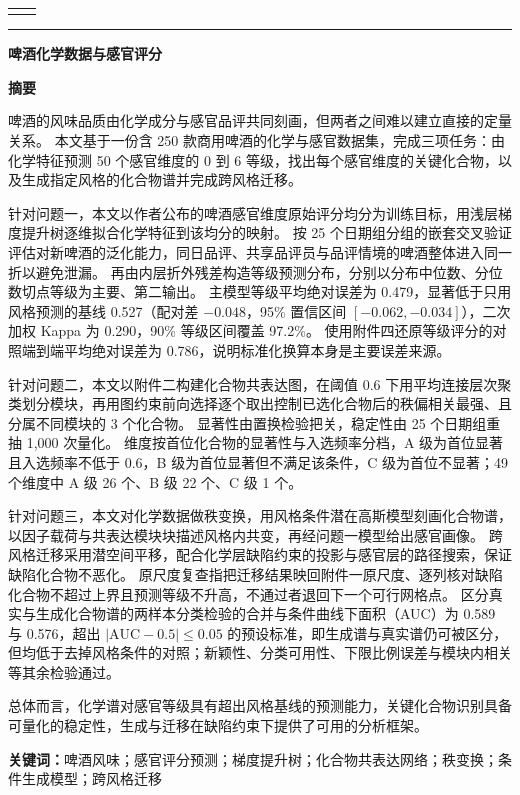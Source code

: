 \documentclass[12pt,a4paper]{article}
\renewcommand{\arraystretch}{1.25}
\newcommand{\teaminfo}[2]{%
  \par\begingroup\centering
  \renewcommand{\arraystretch}{1.15}
  \begin{tabular}{|c|c|}
    \hline
    \makebox[3.9cm][c]{队伍编号} & \makebox[3.9cm][c]{#1} \\
    \hline
    \makebox[3.9cm][c]{赛道} & \makebox[3.9cm][c]{#2} \\
    \hline
  \end{tabular}
  \par\endgroup
}
\renewenvironment{abstract}{%
  \small
  \begin{center}{\bfseries 摘\quad 要}\end{center}%
  \par\vspace{0.5em}%
  \noindent\ignorespaces
}{\par}
\newcommand{\papertitle}{啤酒化学数据与感官评分}
\begin{document}
\vspace*{-0.5cm}
\teaminfo{MCB2607307}{（A）}

\vspace{0.15cm}
\noindent\textcolor{gray}{\rule{14.5cm}{1pt}}
\vspace{0.15cm}

{\centering\bfseries\large\papertitle\par}

\begin{abstract}
啤酒的风味品质由化学成分与感官品评共同刻画，但两者之间难以建立直接的定量关系。
本文基于一份含 250 款商用啤酒的化学与感官数据集，完成三项任务：由化学特征预测 50 个感官维度的 0 到 6 等级，找出每个感官维度的关键化合物，以及生成指定风格的化合物谱并完成跨风格迁移。

针对问题一，本文以作者公布的啤酒感官维度原始评分均分为训练目标，用浅层梯度提升树逐维拟合化学特征到该均分的映射。
按 25 个日期组分组的嵌套交叉验证评估对新啤酒的泛化能力，同日品评、共享品评员与品评情境的啤酒整体进入同一折以避免泄漏。
再由内层折外残差构造等级预测分布，分别以分布中位数、分位数切点等级为主要、第二输出。
主模型等级平均绝对误差为 0.479，显著低于只用风格预测的基线 0.527（配对差 $-0.048$，95\% 置信区间 $[-0.062,-0.034]$），二次加权 Kappa 为 0.290，90\% 等级区间覆盖 97.2\%。
使用附件四还原等级评分的对照端到端平均绝对误差为 0.786，说明标准化换算本身是主要误差来源。

针对问题二，本文以附件二构建化合物共表达图，在阈值 0.6 下用平均连接层次聚类划分模块，再用图约束前向选择逐个取出控制已选化合物后的秩偏相关最强、且分属不同模块的 3 个化合物。
显著性由置换检验把关，稳定性由 25 个日期组重抽 1,000 次量化。
维度按首位化合物的显著性与入选频率分档，A 级为首位显著且入选频率不低于 0.6，B 级为首位显著但不满足该条件，C 级为首位不显著；49 个维度中 A 级 26 个、B 级 22 个、C 级 1 个。

针对问题三，本文对化学数据做秩变换，用风格条件潜在高斯模型刻画化合物谱，以因子载荷与共表达模块块描述风格内共变，再经问题一模型给出感官画像。
跨风格迁移采用潜空间平移，配合化学层缺陷约束的投影与感官层的路径搜索，保证缺陷化合物不恶化。
原尺度复查指把迁移结果映回附件一原尺度、逐列核对缺陷化合物不超过上界且预测等级不升高，不通过者退回下一个可行网格点。
区分真实与生成化合物谱的两样本分类检验的合并与条件曲线下面积（AUC）为 0.589 与 0.576，超出 $|\mathrm{AUC}-0.5|\le 0.05$ 的预设标准，即生成谱与真实谱仍可被区分，但均低于去掉风格条件的对照；新颖性、分类可用性、下限比例误差与模块内相关等其余检验通过。

总体而言，化学谱对感官等级具有超出风格基线的预测能力，关键化合物识别具备可量化的稳定性，生成与迁移在缺陷约束下提供了可用的分析框架。
\end{abstract}

\noindent\textbf{关键词：}啤酒风味；感官评分预测；梯度提升树；化合物共表达网络；秩变换；条件生成模型；跨风格迁移

\clearpage
\tableofcontents
\newpage










\end{document}
